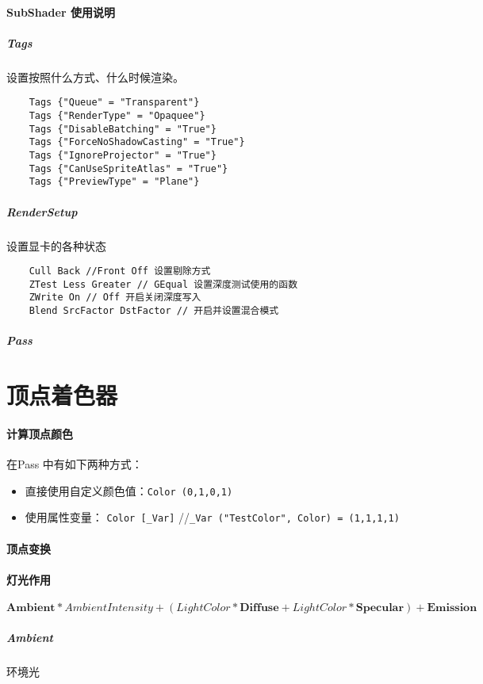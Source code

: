 \documentclass[UTF8,a4paper,12pt]{ctexbook}
\begin{document}
			
		\paragraph{SubShader 使用说明}
			\subparagraph{Tags}
				设置按照什么方式、什么时候渲染。
				\begin{lstlisting}
	Tags {"Queue" = "Transparent"}
	Tags {"RenderType" = "Opaquee"}
	Tags {"DisableBatching" = "True"}
	Tags {"ForceNoShadowCasting" = "True"}
	Tags {"IgnoreProjector" = "True"}	
	Tags {"CanUseSpriteAtlas" = "True"}
	Tags {"PreviewType" = "Plane"}
				\end{lstlisting}
			
			\subparagraph{RenderSetup}
				设置显卡的各种状态
				\begin{lstlisting}
	Cull Back //Front Off 设置剔除方式
	ZTest Less Greater // GEqual 设置深度测试使用的函数
	ZWrite On // Off 开启关闭深度写入
	Blend SrcFactor DstFactor // 开启并设置混合模式
				\end{lstlisting}
						
		
			\subparagraph{Pass}
			
			
		
		
	\section{顶点着色器}
		\paragraph{计算顶点颜色}
			在Pass 中有如下两种方式：
			\begin{itemize}
				\item 直接使用自定义颜色值：\verb|Color (0,1,0,1)|
				\item 使用属性变量： \verb|Color [_Var]| //\verb|_Var ("TestColor", Color) = (1,1,1,1)|
			\end{itemize}
		
		\paragraph{顶点变换}
		
		
		\paragraph{灯光作用}
			$$\mathbf{Ambient}*Ambient Intensity+ (Light Color * \mathbf{Diffuse} + Light  Color* \mathbf{Specular}) + \mathbf{Emission}$$
			
			\subparagraph{Ambient} 环境光
			
\end{document}
